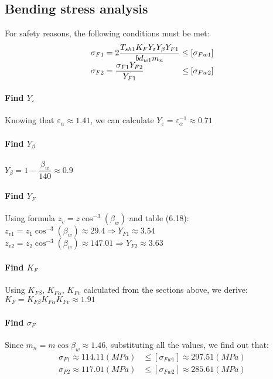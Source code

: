 \subsection{Bending stress analysis}
For safety reasons, the following conditions must be met:
\[
\begin{array}{l@{{} \leq {}}l}
\sigma_{F1} = 2\dfrac{T_{sh1}K_FY_\varepsilon Y_\beta Y_{F1}}{bd_{w1}m_n} & [\sigma_{Fw1}]\\ 
\sigma_{F2} = \dfrac{\sigma_{F1}Y_{F2}}{Y_{F1}} & [\sigma_{Fw2}]
\end{array}
\]

\paragraph{Find $ Y_\varepsilon $} Knowing that $ \varepsilon_\alpha \approx 1.41 $, we can calculate $ Y_\varepsilon = \varepsilon_\alpha^{-1} \approx 0.71 $
\paragraph{Find $ Y_\beta $} $ Y_\beta = 1-\dfrac{\beta_w}{140}\approx0.9$
\paragraph{Find $ Y_F $} Using formula $ z_v = z\cos^{-3}(\beta_w) $ and table (6.18):\\
$ z_{v1} = z_1\cos^{-3}(\beta_w) \approx 29.4 \Rightarrow Y_{F1} \approx 3.54$\\
$ z_{v2} = z_2\cos^{-3}(\beta_w) \approx 147.01 \Rightarrow Y_{F2} \approx 3.63 $
\paragraph{Find $ K_F $}
Using $ K_{F\beta} $, $ K_{F\alpha} $, $ K_{Fv} $ calculated from the sections above, we derive:\\ $ K_F = K_{F\beta}K_{F\alpha}K_{Fv} \approx 1.91 $

\paragraph{Find $ \sigma_F $} Since $ m_n = m\cos\beta_w \approx 1.46$, substituting all the values, we find out that:
\begin{align*}
	\sigma_{F1} \approx 114.11 \unit{(MPa)} & \leq [\sigma_{Fw1}]\approx 297.51 \unit{(MPa)}\\
	\sigma_{F2} \approx 117.01 \unit{(MPa)} & \leq [\sigma_{Fw2}]\approx 285.61 \unit{(MPa)}
\end{align*}

